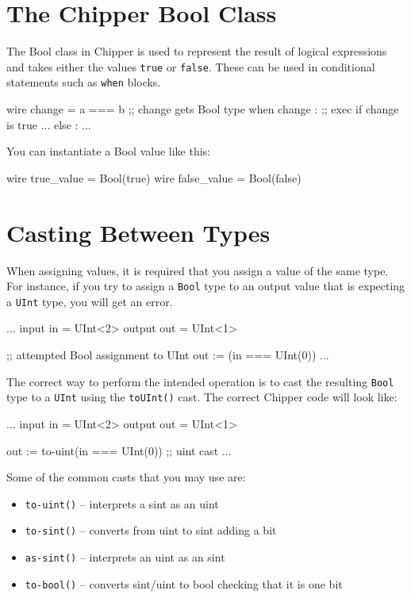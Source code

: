 \section{The Chipper Bool Class}

The Bool class in Chipper is used to represent the result of logical expressions and takes either the values \verb+true+ or \verb+false+. These can be used in conditional statements such as \verb+when+ blocks.

\begin{stanza}
wire change = a === b ;; change gets Bool type
when change :         ;; exec if change is true
  ...
else :
  ...
\end{stanza}

You can instantiate a Bool value like this:

\begin{stanza}
wire true_value  = Bool(true)
wire false_value = Bool(false)
\end{stanza}


\section{Casting Between Types}

When assigning values, it is required that you assign a value of the same type. For instance, if you try to assign a \verb+Bool+ type to an output value that is expecting a \verb+UInt+ type, you will get an error.

\begin{stanza}
  ...
  input in   = UInt<2>
  output out = UInt<1>

  ;; attempted Bool assignment to UInt
  out := (in === UInt(0)) 
  ...
\end{stanza}

The correct way to perform the intended operation is to cast the resulting \verb+Bool+ type to a \verb+UInt+ using the \verb+toUInt()+ cast. The correct Chipper code will look like:

\begin{stanza}
  ...
  input in   = UInt<2>
  output out = UInt<1>

  out := to-uint(in === UInt(0)) ;; uint cast
  ...
\end{stanza}

Some of the common casts that you may use are:

\begin{itemize}
\item \verb+to-uint()+ -- interprets a sint as an uint 
\item \verb+to-sint()+ -- converts from uint to sint adding a bit
\item \verb+as-sint()+ -- interprets an uint as an sint
\item \verb+to-bool()+ -- converts sint/uint to bool checking that it is one bit
\end{itemize}
